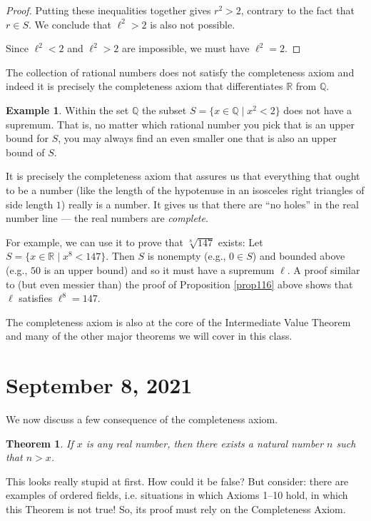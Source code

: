 \documentclass[12pt]{amsart}
\newcommand{\Q}{\mathbb{Q}}
\newcommand{\R}{{\mathbb{R}}}
\numberwithin{equation}{section}
\theoremstyle{plain} %
\newtheorem{thm}[equation]{Theorem}
\newcommand{\Sept}[1]{\section{September #1, 2021}}
\theoremstyle{definition}
\newtheorem{ex}[equation]{Example}
\theoremstyle{remark}
\begin{document}
\begin{proof}
Putting these inequalities together gives $r^2 > 2$, contrary to the fact that $r \in S$. We conclude that $\ell^2 > 2$ is also not possible.

Since $\ell^2 < 2$ and $\ell^2 > 2$ are impossible, we must have $\ell^2 = 2$.
\end{proof}



The collection of rational numbers does not satisfy the completeness axiom and indeed it is precisely the completeness axiom that differentiates $\R$ from
$\Q$. 

\begin{ex} Within the set $\Q$ the subset $S = \{x \in \Q \mid x^2 < 2\}$ does not have a supremum. That is, no matter which rational number you pick that is an
  upper bound for $S$, you may always find an even smaller one that is also an upper bound of $S$. 
\end{ex}

It is precisely the completeness axiom that assures us that everything that ought to be a number (like the length of the hypotenuse in an
isosceles right triangles of side length $1$) really is a number.  It gives us that there are ``no holes'' in the real number line --- the real numbers are {\em
  complete}. 


For example, we can use it to prove that $\sqrt[8]{147}$ exists: Let $S = \{ {x \in \R} \mid x^8 < 147\}$. Then $S$ is nonempty (e.g., $0 \in S$) and bounded above
(e.g., $50$ is an upper bound) and so it must have a supremum $\ell$. 
A proof similar to (but even messier than) the proof of Proposition \ref{prop116} above shows
that $\ell$ satisfies $\ell^8 = 147$. 

The completeness axiom is also at the core of the Intermediate Value Theorem and many of the other major theorems we will
cover in this class. 




\Sept{8}

We now discuss a few consequence of the completeness axiom. 

\begin{thm} \label{thm120}
If $x$ is any real number, then there exists a natural number $n$ such that $n > x$.
\end{thm}

This looks really stupid at first. How could it be false? But consider: there are examples of ordered fields, i.e. situations in which Axioms 1--10 
hold, in which this Theorem is not true! So, its proof must rely on the Completeness Axiom. 
\end{document}
